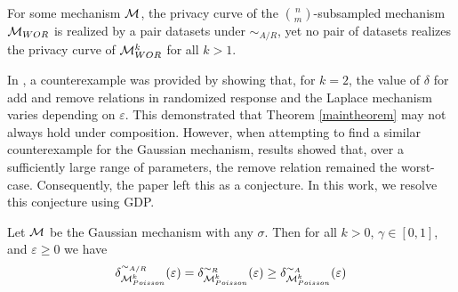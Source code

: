 \documentclass{article}
\begin{document}
\begin{proposition}
    For some mechanism ${\mathcal{M}}$, the privacy curve of the $\binom{n}{m}$-subsampled mechanism ${\mathcal{M}}_{WOR}$ is realized by a pair datasets under $\sim_{A/R}$, yet no pair of datasets realizes the privacy curve of ${\mathcal{M}}_{WOR}^k$ for all $k>1$.
\end{proposition}
In \cite{lebeda2024avoiding}, a counterexample was provided by showing that, for $k = 2$, the value of $\delta$ for add and remove relations in randomized response and the Laplace mechanism varies depending on $\varepsilon$. This demonstrated that Theorem \ref{maintheorem} may not always hold under composition. However, when attempting to find a similar counterexample for the Gaussian mechanism, results showed that, over a sufficiently large range of parameters, the remove relation remained the worst-case. Consequently, the paper left this as a conjecture. In this work, we resolve this conjecture using GDP.

\begin{conjecture}
    Let ${\mathcal{M}}$ be the Gaussian mechanism with any $\sigma$. Then for all $k>0$, $\gamma \in [0,1]$, and $\varepsilon \ge 0$ we have
    \begin{equation*}
        \delta^{\sim_{A/R}}_{{\mathcal{M}}_{Poisson}^k}(\varepsilon) = \delta^{\sim_{R}}_{{\mathcal{M}}_{Poisson}^k}(\varepsilon) \ge \delta^{\sim_{A}}_{{\mathcal{M}}_{Poisson}^k}(\varepsilon)
    \end{equation*}
\end{conjecture}

\end{document}
